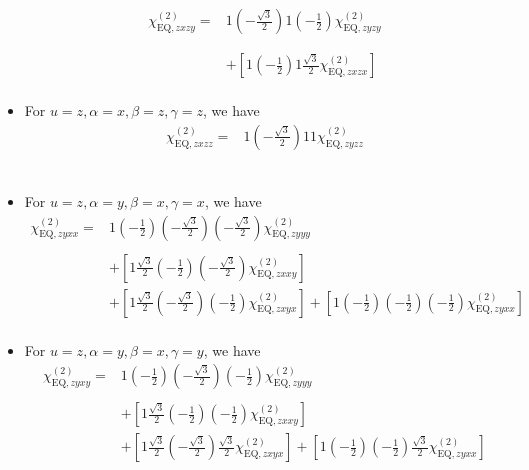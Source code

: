\documentclass[UTF8,10pt,a4paper]{article}
\begin{document}
\begin{itemize}
\footnotesize\begin{align}
\nonumber\chi_{\text{EQ},zxzy}^{(2)}=&1\left(-\frac{\sqrt{3}}{2}\right)1\left(-\frac{1}{2}\right)\chi_{\text{EQ},zyzy}^{(2)}\\
\nonumber&\\
\nonumber&\\
\nonumber&+\left[1\left(-\frac{1}{2}\right)1\frac{\sqrt{3}}{2}\chi_{\text{EQ},zxzx}^{(2)}\right]\\
&
\end{align}\normalsize
\item For $u=z,\alpha=x,\beta=z,\gamma=z$, we have
\footnotesize\begin{align}
\nonumber\chi_{\text{EQ},zxzz}^{(2)}=&1\left(-\frac{\sqrt{3}}{2}\right)11\chi_{\text{EQ},zyzz}^{(2)}\\
\nonumber&\\
\nonumber&\\
\nonumber&\\
&
\end{align}\normalsize
\item For $u=z,\alpha=y,\beta=x,\gamma=x$, we have
\footnotesize\begin{align}
\nonumber\chi_{\text{EQ},zyxx}^{(2)}=&1\left(-\frac{1}{2}\right)\left(-\frac{\sqrt{3}}{2}\right)\left(-\frac{\sqrt{3}}{2}\right)\chi_{\text{EQ},zyyy}^{(2)}\\
\nonumber&\\
\nonumber&+\left[1\frac{\sqrt{3}}{2}\left(-\frac{1}{2}\right)\left(-\frac{\sqrt{3}}{2}\right)\chi_{\text{EQ},zxxy}^{(2)}\right]\\
\nonumber&+\left[1\frac{\sqrt{3}}{2}\left(-\frac{\sqrt{3}}{2}\right)\left(-\frac{1}{2}\right)\chi_{\text{EQ},zxyx}^{(2)}\right]+\left[1\left(-\frac{1}{2}\right)\left(-\frac{1}{2}\right)\left(-\frac{1}{2}\right)\chi_{\text{EQ},zyxx}^{(2)}\right]\\
&
\end{align}\normalsize
\item For $u=z,\alpha=y,\beta=x,\gamma=y$, we have
\footnotesize\begin{align}
\nonumber\chi_{\text{EQ},zyxy}^{(2)}=&1\left(-\frac{1}{2}\right)\left(-\frac{\sqrt{3}}{2}\right)\left(-\frac{1}{2}\right)\chi_{\text{EQ},zyyy}^{(2)}\\
\nonumber&\\
\nonumber&+\left[1\frac{\sqrt{3}}{2}\left(-\frac{1}{2}\right)\left(-\frac{1}{2}\right)\chi_{\text{EQ},zxxy}^{(2)}\right]\\
\nonumber&+\left[1\frac{\sqrt{3}}{2}\left(-\frac{\sqrt{3}}{2}\right)\frac{\sqrt{3}}{2}\chi_{\text{EQ},zxyx}^{(2)}\right]+\left[1\left(-\frac{1}{2}\right)\left(-\frac{1}{2}\right)\frac{\sqrt{3}}{2}\chi_{\text{EQ},zyxx}^{(2)}\right]\\

\end{align}
\end{itemize}
\end{document}
